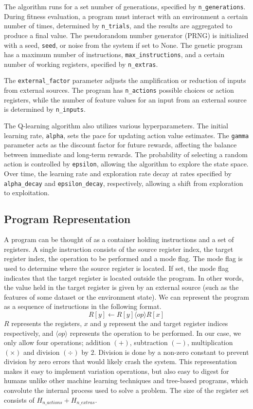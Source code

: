 \documentclass[12pt, final]{dalcsthesis}
\begin{document}
The algorithm runs for a set number of generations, specified by \texttt{n\_generations}. During fitness evaluation, a program must interact with an environment a certain number of times, determined by \texttt{n\_trials}, and the results are aggregated to produce a final value. The pseudorandom number generator (PRNG) is initialized with a seed, \texttt{seed}, or noise from the system if set to None. The genetic program has a maximum number of instructions, \texttt{max\_instructions}, and a certain number of working registers, specified by \texttt{n\_extras}.

The \texttt{external\_factor} parameter adjusts the amplification or reduction of inputs from external sources. The program has \texttt{n\_actions} possible choices or action registers, while the number of feature values for an input from an external source is determined by \texttt{n\_inputs}.

The Q-learning algorithm also utilizes various hyperparameters. The initial learning rate, \texttt{alpha}, sets the pace for updating action value estimates. The \texttt{gamma} parameter acts as the discount factor for future rewards, affecting the balance between immediate and long-term rewards. The probability of selecting a random action is controlled by \texttt{epsilon}, allowing the algorithm to explore the state space. Over time, the learning rate and exploration rate decay at rates specified by \texttt{alpha\_decay} and \texttt{epsilon\_decay}, respectively, allowing a shift from exploration to exploitation.

\subsection{Program Representation}
A program can be thought of as a container holding instructions and a set of registers. A single instruction consists of the source register index, the target register index, the operation to be performed and a mode flag. The mode flag is used to determine where the source register is located. If set, the mode flag indicates that the target register is located outside the program. In other words, the value held in the target register is given by an external source (such as the features of some dataset or the environment state). We can represent the program as a sequence of instructions in the following format.
\begin{equation}
	R[y] \leftarrow R[y] \langle op \rangle  R[x]
\end{equation}
$R$ represents the registers, $x$ and $y$ represent the and target register indices respectively, and $\langle op \rangle$ represents the operation to be performed. In our case, we only allow four operations; addition $(+)$,
subtraction $(-)$, multiplication $(\times)$ and division $(\div)$ by $2$. Division is done by a non-zero constant to prevent division by zero errors that would likely crash the system. This representation makes it easy to implement variation operations, but also easy to digest for humans unlike other machine learning techniques and tree-based programs, which convolute the internal process used to solve a problem. The size of the register set consists of $H_{n\_actions} +  H_{n\_extras}$.
\end{document}
